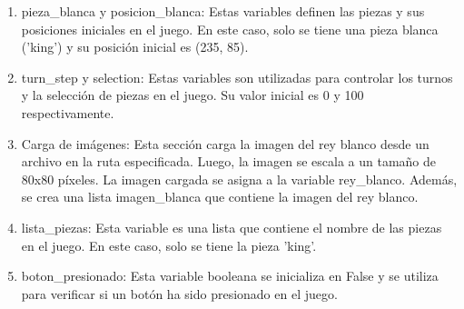 \begin{enumerate}
\begin{enumerate}
    \item pieza\_blanca y posicion\_blanca: Estas variables definen las piezas y sus posiciones iniciales en el juego. En este caso, solo se tiene una pieza blanca ('king') y su posición inicial es (235, 85).\newline
    
    \item turn\_step y selection: Estas variables son utilizadas para controlar los turnos y la selección de piezas en el juego. Su valor inicial es 0 y 100 respectivamente.\newline
    
    \item Carga de imágenes: Esta sección carga la imagen del rey blanco desde un archivo en la ruta especificada. Luego, la imagen se escala a un tamaño de 80x80 píxeles. La imagen cargada se asigna a la variable rey\_blanco. Además, se crea una lista imagen\_blanca que contiene la imagen del rey blanco.\newline
    
    \item lista\_piezas: Esta variable es una lista que contiene el nombre de las piezas en el juego. En este caso, solo se tiene la pieza 'king'.\newline
    
    \item boton\_presionado: Esta variable booleana se inicializa en False y se utiliza para verificar si un botón ha sido presionado en el juego.\newline
\end{enumerate}


\end{enumerate}
